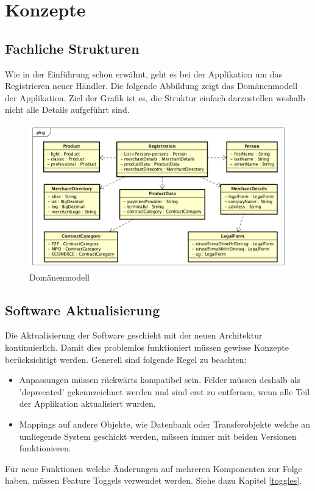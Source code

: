 \graphicspath{{./images/}}

\chapter{Konzepte}

\section{Fachliche Strukturen}

Wie in der Einführung schon erwähnt, geht es bei der Applikation um das Registrieren neuer Händler. Die folgende Abbildung zeigt das Domänenmodell der Applikation. Ziel der Grafik ist es, die Struktur einfach darzustellen weshalb nicht alle Details aufgeführt sind. 

\begin{figure}[H]
	\centering
	\includegraphics[scale=0.6]{DomainModel.png}
	\caption{Domänenmodell}
\end{figure}

\section{Software Aktualisierung}
\label{software-update}

Die Aktualisierung der Software geschieht mit der neuen Architektur kontinuierlich. Damit dies problemlos funktioniert müssen gewisse Konzepte berücksichtigt werden. Generell sind folgende Regel zu beachten:
\begin{itemize}
	\item Anpassungen müssen rückwärts kompatibel sein. Felder müssen deshalb als 'deprecated' gekennzeichnet werden und sind erst zu entfernen, wenn alle Teil der Applikation aktualisiert wurden.
	\item Mappings auf andere Objekte, wie Datenbank oder Transferobjekte welche an umliegende System geschickt werden, müssen immer mit beiden Versionen funktionieren.
\end{itemize}
Für neue Funktionen welche Änderungen auf mehreren Komponenten zur Folge haben, müssen Feature Toggels verwendet werden. Siehe dazu Kapitel \ref{toggles}.

